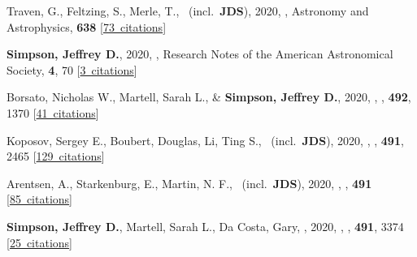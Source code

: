 \item[{\color{numcolor}\scriptsize43}] Traven, G., Feltzing, S., Merle, T., \etal\ (incl.\ \textbf{JDS}), 2020, , Astronomy and Astrophysics, \textbf{638} [\href{https://ui.adsabs.harvard.edu/#abs/2020A&A...638A.145T}{73~citations}]

\item[{\color{numcolor}\scriptsize42}] \textbf{Simpson, Jeffrey D.}, 2020, , Research Notes of the American Astronomical Society, \textbf{4}, 70 [\href{https://ui.adsabs.harvard.edu/#abs/2020RNAAS...4...70S}{3~citations}]

\item[{\color{numcolor}\scriptsize41}] Borsato, Nicholas W., Martell, Sarah L., \& \textbf{Simpson, Jeffrey D.}, 2020, , \mnras, \textbf{492}, 1370 [\href{https://ui.adsabs.harvard.edu/#abs/2020MNRAS.492.1370B}{41~citations}]

\item[{\color{numcolor}\scriptsize40}] Koposov, Sergey E., Boubert, Douglas, Li, Ting S., \etal\ (incl.\ \textbf{JDS}), 2020, , \mnras, \textbf{491}, 2465 [\href{https://ui.adsabs.harvard.edu/#abs/2020MNRAS.491.2465K}{129~citations}]

\item[{\color{numcolor}\scriptsize39}] Arentsen, A., Starkenburg, E., Martin, N. F., \etal\ (incl.\ \textbf{JDS}), 2020, , \mnras, \textbf{491} [\href{https://ui.adsabs.harvard.edu/#abs/2020MNRAS.491L..11A}{85~citations}]

\item[{\color{numcolor}\scriptsize38}] \textbf{Simpson, Jeffrey D.}, Martell, Sarah L., Da Costa, Gary, \etal, 2020, , \mnras, \textbf{491}, 3374 [\href{https://ui.adsabs.harvard.edu/#abs/2020MNRAS.491.3374S}{25~citations}]

